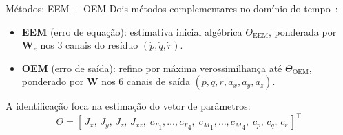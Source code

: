 \documentclass[aspectratio=169,11pt]{beamer}
\begin{document}
\begin{frame}{Métodos: EEM $+$ OEM}
  Dois métodos complementares no domínio do tempo~\cite{Jategaonkar2015}:
  \begin{itemize}
    \item \textbf{EEM} (erro de equação): estimativa inicial algébrica $\Theta_{\text{EEM}}$, ponderada por $\mathbf{W}_e$ nos 3 canais do resíduo $(\dot p,\dot q,\dot r)$.
    \item \textbf{OEM} (erro de saída): refino por máxima verossimilhança até $\Theta_{\text{OEM}}$, ponderado por $\mathbf{W}$ nos 6 canais de saída $(p,q,r,a_x,a_y,a_z)$.
  \end{itemize}
  A identificação foca na estimação do vetor de parâmetros:
  \begin{equation*}
    \Theta = [\,J_x,\,J_y,\,J_z,\,J_{xz},\;{c_T}_1,\dots,{c_T}_4,\;{c_M}_1,\dots,{c_M}_4,\;c_p,\,c_q,\,c_r\,]^\top \tag{4.8}
  \end{equation*}
\end{frame}
\end{document}
